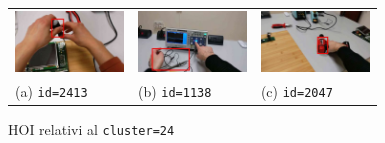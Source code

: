 \begin{figure}[ht]
    \centering
    \begin{tabular}{>{\centering\arraybackslash}m{0.29\linewidth} 
                    >{\centering\arraybackslash}m{0.29\linewidth} 
                    >{\centering\arraybackslash}m{0.29\linewidth}}
        \includegraphics[width=\linewidth]{Images/cluster24-0.jpg} &
        \includegraphics[width=\linewidth]{Images/cluster24-1.jpg} &
        \includegraphics[width=\linewidth]{Images/cluster24-2.jpg} \\
        (a) \texttt{id=2413} & (b) \texttt{id=1138} & (c) \texttt{id=2047}
    \end{tabular}
    \caption{HOI relativi al \texttt{cluster=24}}
    \label{fig:cluster24}
\end{figure}


